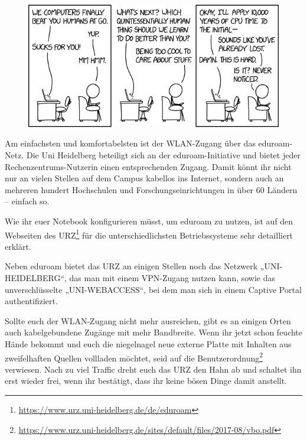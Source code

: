 \begin{figure}[h]
    \centering
    \vspace{-5mm}

    \vspace{-5mm}

\end{figure}

\begin{figure}[t]
\centering
\includegraphics[width=.8\textwidth]{bilder/computers_vs_humans.png}
\end{figure}



Am einfachsten und komfortabelsten ist der WLAN-Zugang über das e\-du\-roam-Netz. Die Uni Heidelberg beteiligt sich an der eduroam-Initiative und bietet jeder Rechenzentrums-Nutzerin einen entsprechenden Zugang. Damit könnt ihr nicht nur an vielen Stellen auf dem Campus kabellos ins Internet, sondern auch an mehreren hundert Hochschulen und Forschungseinrichtungen in über 60 Ländern – einfach so.

Wie ihr euer Notebook konfigurieren müsst, um eduroam zu nutzen, ist auf den Webseiten des URZ\footnote{\url{https://www.urz.uni-heidelberg.de/de/eduroam}} für die unterschiedlichsten Betriebssysteme sehr detailliert erklärt.

Neben eduroam bietet das URZ an einigen Stellen noch das Netzwerk „UNI-HEIDELBERG“, das man mit einem VPN-Zugang nutzen kann, sowie das unverschlüsselte „UNI-WEBACCESS“, bei dem man sich in einem Captive Portal authentifiziert. 

Sollte euch der WLAN-Zugang nicht mehr ausreichen, gibt es an einigen Orten auch kabelgebundene Zugänge mit mehr Bandbreite. Wenn ihr jetzt schon feuchte Hände bekommt und euch die niegelnagel neue externe Platte mit Inhalten aus zweifelhaften Quellen vollladen möchtet, seid auf die Benutzerordnung\footnote{\url{https://www.urz.uni-heidelberg.de/sites/default/files/2017-08/vbo.pdf}} verwiesen. Nach zu viel Traffic dreht euch das \gls{URZ} den Hahn ab und schaltet ihn erst wieder frei, wenn ihr bestätigt, dass ihr keine bösen Dinge damit anstellt.

